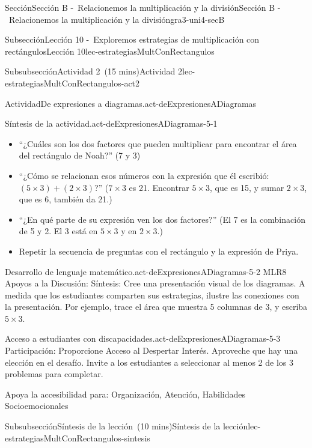 \documentclass[oneside,10pt,]{article}
\begin{document}
\begin{sectionptx}{Sección}{Sección B -~Relacionemos la multiplicación y la división}{}{Sección B -~Relacionemos la multiplicación y la división}{}{}{gra3-uni4-secB}
\begin{subsectionptx}{Subsección}{Lección 10 -~Exploremos estrategias de multiplicación con rectángulos}{}{Lección 10}{}{}{lec-estrategiasMultConRectangulos}
\begin{subsubsectionptx}{Subsubsección}{Actividad 2~(15 mins)}{}{Actividad 2}{}{}{lec-estrategiasMultConRectangulos-act2}
\begin{activity}{Actividad}{De expresiones a diagramas.}{act-deExpresionesADiagramas}
\begin{sidebyside}{3}{0.0166666666666667}{0.0166666666666667}{0.0333333333333333}
\end{sidebyside}%
\end{activity}%
%
\par
\begin{paragraphs}{Síntesis de la actividad.}{act-deExpresionesADiagramas-5-1}%
%
\begin{itemize}[label=\textbullet]
\item{}``¿Cuáles son los dos factores que pueden multiplicar para encontrar el área del rectángulo de Noah?'' (7 y 3)%
\item{}``¿Cómo se relacionan esos números con la expresión que él escribió: \((5\times 3)+(2 \times 3)\)?'' (\(7 \times 3\) es 21. Encontrar \(5\times3\), que es 15, y sumar \(2\times3\), que es 6, también da 21.)%
\item{}``¿En qué parte de su expresión ven los dos factores?'' (El 7 es la combinación de 5 y 2. El 3 está en \(5 \times 3\) y en \(2 \times 3\).)%
\item{}Repetir la secuencia de preguntas con el rectángulo y la expresión de Priya.%
\end{itemize}
\end{paragraphs}%
\begin{paragraphs}{Desarrollo de lenguaje matemático.}{act-deExpresionesADiagramas-5-2}%
MLR8 Apoyos a la Discusión: Síntesis: Cree una presentación visual de los diagramas. A medida que los estudiantes comparten sus estrategias, ilustre las conexiones con la presentación. Por ejemplo, trace el área que muestra 5 columnas de 3, y escriba \(5\times 3\).%
\end{paragraphs}%
\begin{paragraphs}{Acceso a estudiantes con discapacidades.}{act-deExpresionesADiagramas-5-3}%
Participación: Proporcione Acceso al Despertar Interés. Aproveche que hay una elección en el  desafío. Invite a los estudiantes a seleccionar al menos 2 de los 3 problemas para completar.%
\par
Apoya la accesibilidad para: Organización, Atención, Habilidades Socioemocionales%
\end{paragraphs}%
\end{subsubsectionptx}
%
%
\typeout{************************************************}
\typeout{************************************************}
%
\begin{subsubsectionptx}{Subsubsección}{Síntesis de la lección~(10 mins)}{}{Síntesis de la lección}{}{}{lec-estrategiasMultConRectangulos-sintesis}

\end{subsubsectionptx}
\end{subsectionptx}
\end{sectionptx}
\end{document}
